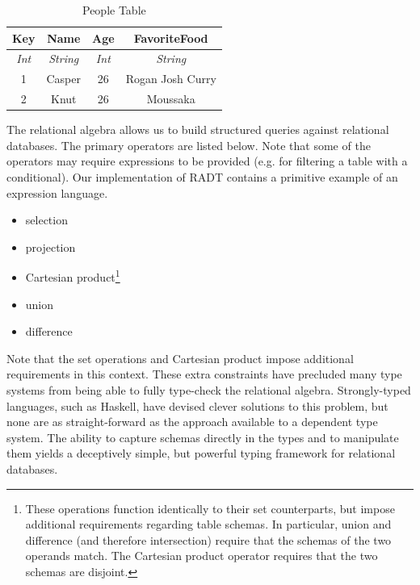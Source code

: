 \documentclass[12pt]{report}
\begin{document}
\begin{table}[tb]
    \caption{People Table}
    \label{tab:people_table}
    \centering

    \begin{tabular}{|c|c|c|c|}
    \hline

    \hline
    \textbf{Key} & \textbf{Name} & \textbf{Age} & \textbf{FavoriteFood} \\
    \hline
    \textit{Int} & \textit{String} & \textit{Int} & \textit{String} \\
    \hline
    \hline
       1 & Casper & 26 & Rogan Josh Curry \\
       2 & Knut & 26 & Moussaka \\
    \hline

    \end{tabular}
\end{table}

The relational algebra allows us to build structured queries against relational databases.
The primary operators are listed below.
Note that some of the operators may require expressions to be provided (e.g. for filtering a table with a conditional).
Our implementation of RADT contains a primitive example of an expression language.

\begin{itemize}
    \item selection
    \item projection
    \item Cartesian product\footnote{\label{fn:set_ops} These operations function identically to their set counterparts, but impose additional requirements regarding table schemas. In particular, union and difference (and therefore intersection) require that the schemas of the two operands match. The Cartesian product operator requires that the two schemas are disjoint.}
    \item union\footnotemark[\ref{fn:set_ops}]
    \item difference\footnotemark[\ref{fn:set_ops}]
\end{itemize}

Note that the set operations and Cartesian product impose additional requirements in this context.
These extra constraints have precluded many type systems from being able to fully type-check the relational algebra.
Strongly-typed languages, such as Haskell, have devised clever solutions to this problem, but none are as straight-forward as the approach available to a dependent type system.
The ability to capture schemas directly in the types and to manipulate them yields a deceptively simple, but powerful typing framework for relational databases.
\end{document}
